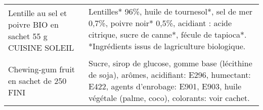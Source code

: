\begin{longtable}{p{5cm}p{10cm}}
                                              Lentille au sel et poivre BIO en sachet 55 g CUISINE SOLEIL &                                                                                                                                                                                                                                                                                                                                                                                                                                                                                                                                                                                                                                                                                                                                                                                                                                                 Lentilles* 96\%, huile de tournesol*, sel de mer 0,7\%, poivre noir* 0,5\%, acidiant : acide citrique, sucre de canne*, fécule de tapioca*. *Ingrédients issus de lagriculture biologique. \\
                                                                 Chewing-gum fruit en sachet de 250  FINI &                                                                                                                                                                                                                                                                                                                                                                                                                                                                                                                                                                                                                                                                                                                                                                                                                                                 Sucre, sirop de glucose, gomme base (lécithine de soja), arômes, acidifiant: E296, humectant: E422, agents d'enrobage: E901, E903, huile végétale (palme, coco), colorants: voir cachet. \\

\end{longtable}
